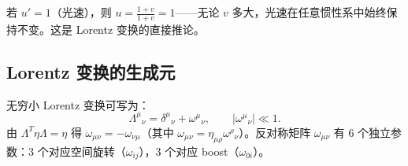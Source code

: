 \begin{example}[速度加法与光速不变]
若 $u' = 1$（光速），则 $u = \frac{1 + v}{1 + v} = 1$——无论 $v$ 多大，光速在任意惯性系中始终保持不变。这是 Lorentz 变换的直接推论。
\end{example}

\subsection{Lorentz 变换的生成元}

无穷小 Lorentz 变换可写为：
\begin{equation}
    \Lambda^\mu{}_\nu = \delta^\mu{}_\nu + \omega^\mu{}_\nu, \qquad |\omega^\mu{}_\nu| \ll 1.
\end{equation}
由 $\Lambda^T\eta\Lambda = \eta$ 得 $\omega_{\mu\nu} = -\omega_{\nu\mu}$（其中 $\omega_{\mu\nu} = \eta_{\mu\rho}\omega^\rho{}_\nu$）。反对称矩阵 $\omega_{\mu\nu}$ 有 $6$ 个独立参数：$3$ 个对应空间旋转（$\omega_{ij}$），$3$ 个对应 boost（$\omega_{0i}$）。

